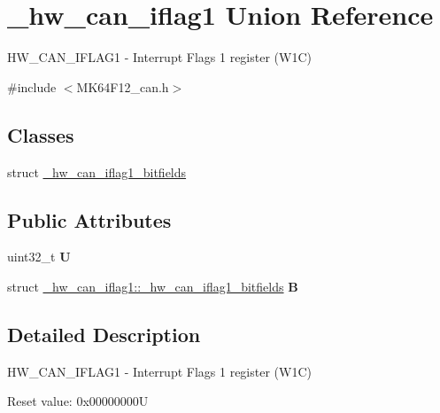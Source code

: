 \hypertarget{union__hw__can__iflag1}{}\section{\+\_\+hw\+\_\+can\+\_\+iflag1 Union Reference}
\label{union__hw__can__iflag1}


H\+W\+\_\+\+C\+A\+N\+\_\+\+I\+F\+L\+A\+G1 -\/ Interrupt Flags 1 register (W1C)  




{\ttfamily \#include $<$M\+K64\+F12\+\_\+can.\+h$>$}

\subsection*{Classes}
\begin{DoxyCompactItemize}
\item 
struct \hyperlink{struct__hw__can__iflag1_1_1__hw__can__iflag1__bitfields}{\+\_\+hw\+\_\+can\+\_\+iflag1\+\_\+bitfields}
\end{DoxyCompactItemize}
\subsection*{Public Attributes}
\begin{DoxyCompactItemize}
\item 
uint32\+\_\+t {\bfseries U}\hypertarget{union__hw__can__iflag1_a6b5b197b2f89d9b2c99e3c641bb06b23}{}\label{union__hw__can__iflag1_a6b5b197b2f89d9b2c99e3c641bb06b23}

\item 
struct \hyperlink{struct__hw__can__iflag1_1_1__hw__can__iflag1__bitfields}{\+\_\+hw\+\_\+can\+\_\+iflag1\+::\+\_\+hw\+\_\+can\+\_\+iflag1\+\_\+bitfields} {\bfseries B}\hypertarget{union__hw__can__iflag1_a598c0d70679b3a04544ef5e1ded20148}{}\label{union__hw__can__iflag1_a598c0d70679b3a04544ef5e1ded20148}

\end{DoxyCompactItemize}


\subsection{Detailed Description}
H\+W\+\_\+\+C\+A\+N\+\_\+\+I\+F\+L\+A\+G1 -\/ Interrupt Flags 1 register (W1C) 

Reset value\+: 0x00000000U

